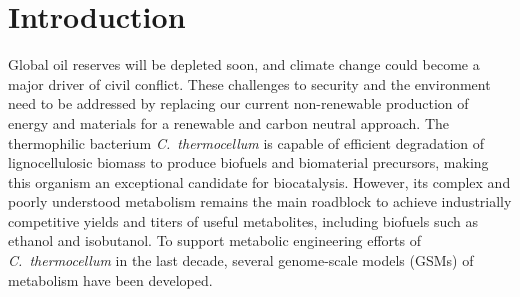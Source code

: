 
\section{Introduction}

Global oil reserves will be depleted soon,\citep{shafiee2009}
and climate change could become a major driver of civil conflict.\citep{hsiang2011}
These challenges to security and the environment need to be addressed by replacing our current non-renewable production of energy and materials for a renewable and carbon neutral approach.\citep{ragauskas2006}
The thermophilic bacterium \textit{C.~thermocellum} is capable of efficient degradation of lignocellulosic biomass to produce biofuels and biomaterial precursors, making this organism an exceptional candidate for biocatalysis.\citep{olson2012}
However, its complex and poorly understood metabolism remains the main roadblock to achieve industrially competitive yields and titers of useful metabolites, including biofuels such as ethanol\citep{tian2016} and isobutanol.\citep{lin2015}
To support metabolic engineering efforts of \textit{C.~thermocellum} in the last decade, several genome-scale models (GSMs) of metabolism have been developed.

